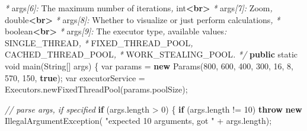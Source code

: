 \documentclass[11pt]{article}
\newenvironment{Shaded}{}{}
\newcommand{\KeywordTok}[1]{\textcolor[rgb]{0.00,0.44,0.13}{\textbf{{#1}}}}
\newcommand{\DataTypeTok}[1]{\textcolor[rgb]{0.56,0.13,0.00}{{#1}}}
\newcommand{\DecValTok}[1]{\textcolor[rgb]{0.25,0.63,0.44}{{#1}}}
\newcommand{\StringTok}[1]{\textcolor[rgb]{0.25,0.44,0.63}{{#1}}}
\newcommand{\CommentTok}[1]{\textcolor[rgb]{0.38,0.63,0.69}{\textit{{#1}}}}
\newcommand{\FunctionTok}[1]{\textcolor[rgb]{0.02,0.16,0.49}{{#1}}}
\newcommand{\NormalTok}[1]{{#1}}
\newcommand{\ControlFlowTok}[1]{\textcolor[rgb]{0.00,0.44,0.13}{\textbf{{#1}}}}
\newcommand{\OperatorTok}[1]{\textcolor[rgb]{0.40,0.40,0.40}{{#1}}}
\newcommand{\BuiltInTok}[1]{{#1}}
\begin{document}
\begin{Shaded}
\begin{Highlighting}[]
     \CommentTok{*}\NormalTok{             args}\CommentTok{[6]:}\NormalTok{ The maximum number of iterations}\CommentTok{,} \CommentTok{\textasciigrave{}}\NormalTok{int}\CommentTok{\textasciigrave{}}\KeywordTok{\textless{}br\textgreater{}}
     \CommentTok{*}\NormalTok{             args}\CommentTok{[7]:}\NormalTok{ Zoom}\CommentTok{,} \CommentTok{\textasciigrave{}}\NormalTok{double}\CommentTok{\textasciigrave{}}\KeywordTok{\textless{}br\textgreater{}}
     \CommentTok{*}\NormalTok{             args}\CommentTok{[8]:}\NormalTok{ Whether to visualize or just perform calculations}\CommentTok{,}
     \CommentTok{*}                      \CommentTok{\textasciigrave{}}\NormalTok{boolean}\CommentTok{\textasciigrave{}}\KeywordTok{\textless{}br\textgreater{}}
     \CommentTok{*}\NormalTok{             args}\CommentTok{[9]:}\NormalTok{ The executor type}\CommentTok{,}\NormalTok{ available values}\CommentTok{:} \CommentTok{\textasciigrave{}}\NormalTok{SINGLE\_THREAD}\CommentTok{\textasciigrave{},}
     \CommentTok{*}                      \CommentTok{\textasciigrave{}}\NormalTok{FIXED\_THREAD\_POOL}\CommentTok{\textasciigrave{},} \CommentTok{\textasciigrave{}}\NormalTok{CACHED\_THREAD\_POOL}\CommentTok{\textasciigrave{},}
     \CommentTok{*}                      \CommentTok{\textasciigrave{}}\NormalTok{WORK\_STEALING\_POOL}\CommentTok{\textasciigrave{}.}
     \CommentTok{*/}
    \KeywordTok{public} \DataTypeTok{static} \DataTypeTok{void} \FunctionTok{main}\OperatorTok{(}\BuiltInTok{String}\OperatorTok{[]}\NormalTok{ args}\OperatorTok{)} \OperatorTok{\{}
        \DataTypeTok{var}\NormalTok{ params }\OperatorTok{=} \KeywordTok{new} \FunctionTok{Params}\OperatorTok{(}\DecValTok{800}\OperatorTok{,} \DecValTok{600}\OperatorTok{,} \DecValTok{400}\OperatorTok{,} \DecValTok{300}\OperatorTok{,} \DecValTok{16}\OperatorTok{,} \DecValTok{8}\OperatorTok{,} \DecValTok{570}\OperatorTok{,} \DecValTok{150}\OperatorTok{,} \KeywordTok{true}\OperatorTok{);}
        \DataTypeTok{var}\NormalTok{ executorService }\OperatorTok{=} \BuiltInTok{Executors}\OperatorTok{.}\FunctionTok{newFixedThreadPool}\OperatorTok{(}\NormalTok{params}\OperatorTok{.}\FunctionTok{poolSize}\OperatorTok{);}

        \CommentTok{// parse args, if specified}
        \ControlFlowTok{if} \OperatorTok{(}\NormalTok{args}\OperatorTok{.}\FunctionTok{length} \OperatorTok{\textgreater{}} \DecValTok{0}\OperatorTok{)} \OperatorTok{\{}
            \ControlFlowTok{if} \OperatorTok{(}\NormalTok{args}\OperatorTok{.}\FunctionTok{length} \OperatorTok{!=} \DecValTok{10}\OperatorTok{)}
                \ControlFlowTok{throw} \KeywordTok{new} \BuiltInTok{IllegalArgumentException}\OperatorTok{(}
                    \StringTok{"expected 10 arguments, got "} \OperatorTok{+}\NormalTok{ args}\OperatorTok{.}\FunctionTok{length}\OperatorTok{);}


\end{Highlighting}
\end{Shaded}
\end{document}
